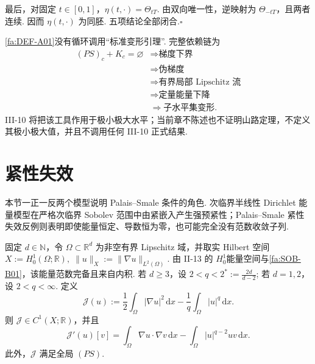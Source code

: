 \begin{FAProof}
最后，对固定 \(\displaystyle t\in[0,1]\)，\(\displaystyle\eta(t,\cdot)=\Theta_{tT}\). 由双向唯一性，逆映射为 \(\displaystyle\Theta_{-tT}\)，且两者连续. 因而 \(\displaystyle\eta(t,\cdot)\) 为同胚. 五项结论全部闭合.\hfill\(\square\)
\end{FAProof}

\begin{FARemark}[变形引理的逻辑链]
\autoref{fa:DEF-A01}没有循环调用“标准变形引理”. 完整依赖链为
\[
\begin{aligned}
(PS)_c+K_c=\varnothing
&\Longrightarrow \text{梯度下界}\\
&\Longrightarrow \text{伪梯度}\\
&\Longrightarrow \text{有界局部 Lipschitz 流}\\
&\Longrightarrow \text{定量能量下降}\\
&\Longrightarrow \text{子水平集变形}.
\end{aligned}
\]
III-10 将把该工具作用于极小极大水平；当前章不陈述也不证明山路定理，不定义其极小极大值，并且不调用任何 III-10 正式结果.
\end{FARemark}

\section{紧性失效}\label{sec:iii09-compactness-failure}

本节一正一反两个模型说明 Palais--Smale 条件的角色. 次临界半线性 Dirichlet 能量模型在严格次临界 Sobolev 范围中由紧嵌入产生强预紧性；Palais--Smale 紧性失效反例则表明即使能量恒定、导数恒为零，也可能完全没有范数收敛子列.

\begin{FAApplication}
固定 \(\displaystyle d\in\mathbb N\)，令 \(\displaystyle\Omega\subset\mathbb R^d\) 为非空有界 Lipschitz 域，并取实 Hilbert 空间
\(\displaystyle X:=H_0^1(\Omega;\mathbb R), \; \|u\|_X:=\|\nabla u\|_{L^2(\Omega)}\).
由 II-13 的 \(\displaystyle H_0^1\)能量空间与\autoref{fa:SOB-B01}，该能量范数完备且来自内积. 若 \(\displaystyle d\geqslant3\)，设
\(\displaystyle 2<q<2^*:=\frac{2d}{d-2}\);
若 \(\displaystyle d=1,2\)，设 \(\displaystyle2<q<\infty\). 定义
\[
\mathcal J(u)
:=
\frac{1}{2}\int_\Omega|\nabla u|^2\,\mathrm{d}x
-
\frac{1}{q}\int_\Omega|u|^q\,\mathrm{d}x.
\]
则 \(\displaystyle\mathcal J\in C^1(X;\mathbb R)\)，并且
\[
\mathcal J'(u)[v]
=
\int_\Omega\nabla u\mathbin{\cdot}\nabla v\,\mathrm{d}x
-
\int_\Omega|u|^{q-2}uv\,\mathrm{d}x.
\]
此外，\(\displaystyle\mathcal J\) 满足全局 \(\displaystyle(PS)\).
\end{FAApplication}

